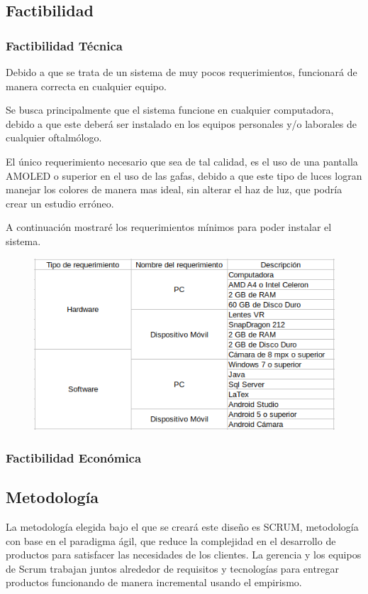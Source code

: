 \documentclass[10pt]{article}
\begin{document}
\subsection{Factibilidad}
\subsubsection{Factibilidad Técnica}

Debido a que se trata de un sistema de muy pocos requerimientos, funcionará de manera correcta en cualquier equipo.

Se busca principalmente que el sistema funcione en cualquier computadora, debido a que este deberá ser instalado en los equipos personales y/o laborales de cualquier oftalmólogo.

El único requerimiento necesario que sea de tal calidad, es el uso de una pantalla AMOLED o superior en el uso de las gafas, debido a que este tipo de luces logran manejar los colores de manera mas ideal, sin alterar el haz de luz, que podría crear un estudio erróneo.

A continuación mostraré los requerimientos mínimos para poder instalar el sistema.


\begin{figure}[H]
	\begin{center}
\includegraphics[scale = 0.80]{Imagenes/tabla.png}
	\end{center} 
\end{figure}

\subsubsection{Factibilidad Económica}

\subsection{Metodología}
La metodología elegida bajo el que se creará este diseño es SCRUM, metodología con base en el paradigma ágil, que reduce la complejidad en el desarrollo de productos para satisfacer las necesidades de los clientes. La gerencia y los equipos de Scrum trabajan juntos alrededor de requisitos y tecnologías para entregar productos funcionando de manera incremental usando el empirismo. 
\end{document}
